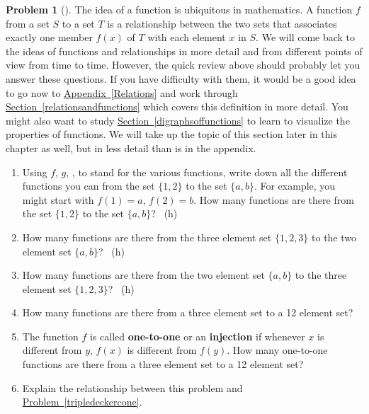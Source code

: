 \documentclass[10pt,]{book}
\newcommand{\terminology}[1]{\textbf{#1}}
\theoremstyle{plain}
\theoremstyle{definition}
\newtheorem{activity}[project]{Problem}
\theoremstyle{definition}
\numberwithin{equation}{chapter}
\begin{document}
\begin{activity}[] \label{countingfunctions}
\hypertarget{p-50}{}%
The idea of a function is ubiquitous in mathematics. A function \(f\) from a set \(S\) to a set \(T\) is a relationship between the two sets that associates exactly one member \(f(x)\) of \(T\) with each element \(x\) in \(S\). We will come back to the ideas of functions and relationships in more detail and from different points of view from time to time. However, the quick review above should probably let you answer these questions. If you have difficulty with them, it would be a good idea to go now to \hyperref[Relations]{Appendix~\ref{Relations}} and work through \hyperref[relationsandfunctions]{Section~\ref{relationsandfunctions}} which covers this definition in more detail. You might also want to study \hyperref[digraphsoffunctions]{Section~\ref{digraphsoffunctions}} to learn to visualize the properties of functions. We will take up the topic of this section later in this chapter as well, but in less detail than is in the appendix.%
\begin{enumerate}[font=\bfseries,label=(\alph*),ref=\alph*]
\item\label{countingfunctionsparta} \marginsymbol[-2.5em]{} \hypertarget{p-51}{}%
Using \(f\), \(g\), \textellipsis{}, to stand for the various functions, write down all the different functions you can from the set \(\{1,2\}\) to the set \(\{a,b\}\).  For example, you might start with \(f(1)=a\), \(f(2)=b\).  How many functions are there from the set \(\{1,2\}\) to the set \(\{a,b\}\)?%
~{\tiny (h)}\item\label{task-6} \marginsymbol[-2.5em]{} \hypertarget{p-54}{}%
How many functions are there from the three element set \(\{1,2,3\}\) to the two element set \(\{a,b\}\)?%
~{\tiny (h)}\item\label{task-7} \marginsymbol[-2.5em]{} \hypertarget{p-57}{}%
How many functions are there from the two element set \(\{a,b\}\) to the three element set \(\{1,2,3\}\)?%
~{\tiny (h)}\item\label{task-8} \marginsymbol[-2.5em]{} \hypertarget{p-60}{}%
How many functions are there from a three element set to a 12 element set?%
\item\label{task-9} \marginsymbol[-2.5em]{} \hypertarget{p-62}{}%
The function \(f\) is called \terminology{one-to-one} or an \terminology{injection} if whenever \(x\) is different from \(y\), \(f(x)\) is different from \(f(y)\).  How many one-to-one functions are there from a three element set to a  12 element set?%
\item\label{task-10} \marginsymbol[-2.5em]{} \hypertarget{p-64}{}%
Explain the relationship between this problem and \hyperref[tripledeckercone]{Problem~\ref{tripledeckercone}}.%
\end{enumerate}
\end{activity}
\end{document}
